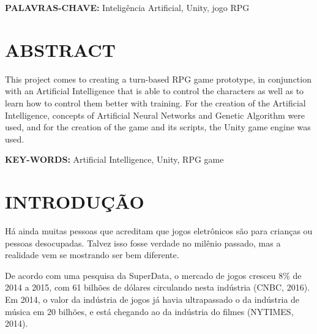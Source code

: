\documentclass[12pt,a4paper]{article}
\begin{document}
	\vspace{0.8cm}
	\noindent
	\textbf{PALAVRAS-CHAVE:} Inteligência Artificial, Unity, jogo RPG

\onehalfspacing

\newpage %
\thispagestyle{empty} %
\section*{\hfil ABSTRACT} %
	\singlespace
	\noindent
	This project comes to creating a turn-based RPG game prototype,
	in conjunction with an Artificial Intelligence that is able to control the characters
	as well as to learn how to control them better with training.
	For the creation of the Artificial Intelligence,
	concepts of Artificial Neural Networks and Genetic Algorithm were used,
	and for the creation of the game and its scripts,
	the Unity game engine was used.
	
	\vspace{0.8cm}
	\noindent
	\textbf{KEY-WORDS:} Artificial Intelligence, Unity, RPG game

\onehalfspacing

\newpage %
\thispagestyle{empty} %
\listoffigures %

\newpage %
\thispagestyle{empty} %
\listoftables %

\newpage %
\thispagestyle{empty} %
\tableofcontents %

\newpage %
\section{INTRODUÇÃO}
	Há ainda muitas pessoas que acreditam que jogos eletrônicos são para crianças ou pessoas desocupadas.
	Talvez isso fosse verdade no milênio passado, mas a realidade vem se mostrando ser bem diferente.
	
	De acordo com uma pesquisa da SuperData,
	o mercado de jogos cresceu 8\% de 2014 a 2015,
	com 61 bilhões de dólares circulando nesta indústria (CNBC, 2016).
	Em 2014, o valor da indústria de jogos já havia ultrapassado o da indústria de música em 20 bilhões,
	e está chegando ao da indústria do filmes (NYTIMES, 2014).
	
\end{document}
